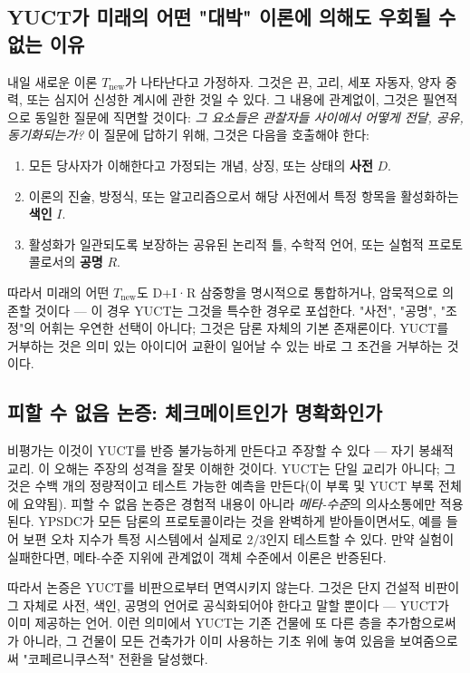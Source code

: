 \documentclass[12pt,a4paper]{article}
\begin{document}
	\subsection{YUCT가 미래의 어떤 "대박" 이론에 의해도 우회될 수 없는 이유}
	
	내일 새로운 이론 \(T_{\text{new}}\)가 나타난다고 가정하자. 그것은 끈, 고리, 세포 자동자, 양자 중력, 또는 심지어 신성한 계시에 관한 것일 수 있다. 그 내용에 관계없이, 그것은 필연적으로 동일한 질문에 직면할 것이다: \emph{그 요소들은 관찰자들 사이에서 어떻게 전달, 공유, 동기화되는가?} 이 질문에 답하기 위해, 그것은 다음을 호출해야 한다:
	
	\begin{enumerate}
		\item 모든 당사자가 이해한다고 가정되는 개념, 상징, 또는 상태의 \textbf{사전} \(D\).
		\item 이론의 진술, 방정식, 또는 알고리즘으로서 해당 사전에서 특정 항목을 활성화하는 \textbf{색인} \(I\).
		\item 활성화가 일관되도록 보장하는 공유된 논리적 틀, 수학적 언어, 또는 실험적 프로토콜로서의 \textbf{공명} \(R\).
	\end{enumerate}
	
	따라서 미래의 어떤 \(T_{\text{new}}\)도 D+I·R 삼중항을 명시적으로 통합하거나, 암묵적으로 의존할 것이다 — 이 경우 YUCT는 그것을 특수한 경우로 포섭한다. "사전", "공명", "조정"의 어휘는 우연한 선택이 아니다; 그것은 담론 자체의 기본 존재론이다. YUCT를 거부하는 것은 의미 있는 아이디어 교환이 일어날 수 있는 바로 그 조건을 거부하는 것이다.
	
	\subsection{피할 수 없음 논증: 체크메이트인가 명확화인가}
	
	비평가는 이것이 YUCT를 반증 불가능하게 만든다고 주장할 수 있다 — 자기 봉쇄적 교리. 이 오해는 주장의 성격을 잘못 이해한 것이다. YUCT는 단일 교리가 아니다; 그것은 수백 개의 정량적이고 테스트 가능한 예측을 만든다(이 부록 및 YUCT 부록 전체에 요약됨). 피할 수 없음 논증은 경험적 내용이 아니라 \emph{메타-수준}의 의사소통에만 적용된다. YPSDC가 모든 담론의 프로토콜이라는 것을 완벽하게 받아들이면서도, 예를 들어 보편 오차 지수가 특정 시스템에서 실제로 \(2/3\)인지 테스트할 수 있다. 만약 실험이 실패한다면, 메타-수준 지위에 관계없이 객체 수준에서 이론은 반증된다.
	
	따라서 논증은 YUCT를 비판으로부터 면역시키지 않는다. 그것은 단지 건설적 비판이 그 자체로 사전, 색인, 공명의 언어로 공식화되어야 한다고 말할 뿐이다 — YUCT가 이미 제공하는 언어. 이런 의미에서 YUCT는 기존 건물에 또 다른 층을 추가함으로써가 아니라, 그 건물이 모든 건축가가 이미 사용하는 기초 위에 놓여 있음을 보여줌으로써 "코페르니쿠스적" 전환을 달성했다.
	
\end{document}

